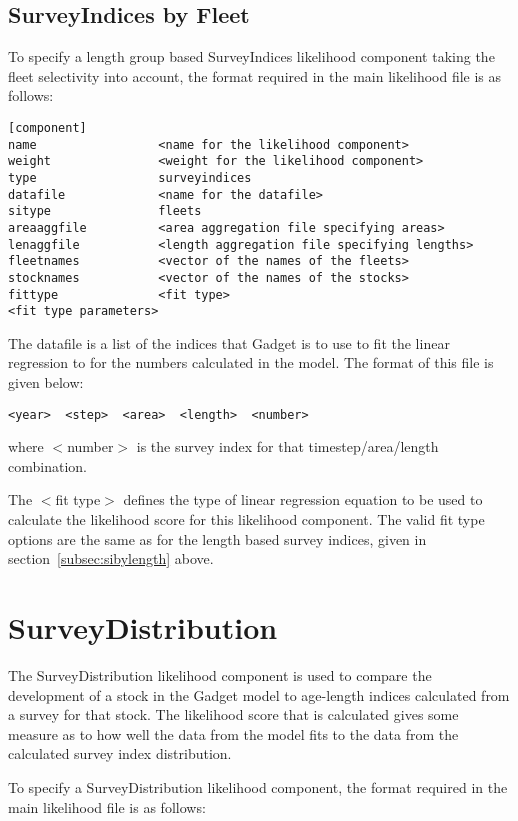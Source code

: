 \documentclass[10pt,twoside]{book}
\begin{document}
\subsection{SurveyIndices by Fleet}\label{subsec:sibyfleet}
To specify a length group based SurveyIndices likelihood component taking the fleet selectivity into account, the format required in the main likelihood file is as follows:

{\small\begin{verbatim}
[component]
name                 <name for the likelihood component>
weight               <weight for the likelihood component>
type                 surveyindices
datafile             <name for the datafile>
sitype               fleets
areaaggfile          <area aggregation file specifying areas>
lenaggfile           <length aggregation file specifying lengths>
fleetnames           <vector of the names of the fleets>
stocknames           <vector of the names of the stocks>
fittype              <fit type>
<fit type parameters>
\end{verbatim}}

The datafile is a list of the indices that Gadget is to use to fit the linear regression to for the numbers calculated in the model.  The format of this file is given below:

{\small\begin{verbatim}
<year>  <step>  <area>  <length>  <number>
\end{verbatim}}

where $<$number$>$ is the survey index for that timestep/area/length combination.

\bigskip
The $<$fit type$>$ defines the type of linear regression equation to be used to calculate the likelihood score for this likelihood component.  The valid fit type options are the same as for the length based survey indices, given in section~\ref{subsec:sibylength} above.

\section{SurveyDistribution}\label{sec:surveydistribution}
The SurveyDistribution likelihood component is used to compare the development of a stock in the Gadget model to age-length indices calculated from a survey for that stock.  The likelihood score that is calculated gives some measure as to how well the data from the model fits to the data from the calculated survey index distribution.

\bigskip
To specify a SurveyDistribution likelihood component, the format required in the main likelihood file is as follows:
\end{document}
